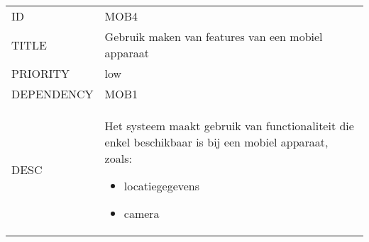 \begin{longtable}{lp{10cm}}
ID           & MOB4\\
TITLE        & Gebruik maken van features van een mobiel apparaat\\
PRIORITY     & low\\
DEPENDENCY   & MOB1\\
DESC         & Het systeem maakt gebruik van functionaliteit die enkel beschikbaar is bij een mobiel apparaat, zoals:
\begin{itemize}
\item locatiegegevens
\item camera
\end{itemize}  
\end{longtable}
